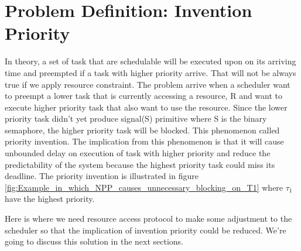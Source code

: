 \section{Problem Definition: Invention Priority}

In theory, a set of task that are schedulable will be executed upon on its arriving time and preempted if a task with higher priority arrive. That will not be always true if we apply resource constraint. The problem arrive when a scheduler want to preempt a lower task that is currently accessing a  resource, R and want to execute higher priority task that also want to use the resource. Since the lower priority task didn't yet produce signal(S) primitive where S is the binary semaphore, the higher priority task will be blocked. This phenomenon called priority invention. The implication from this phenomenon is that it will cause unbounded delay on execution of task with higher priority and reduce the predictability of the system because the highest priority task could miss its deadline. The priority invention is illustrated in figure \ref{fig:Example_in_which_NPP_causes_unnecessary_blocking_on_T1} where $ \tau_{1} $ have the highest priority.

Here is where we need resource access protocol to make some adjustment to the scheduler so that the implication of invention priority could be reduced. We're going to discuss this solution in the next sections.